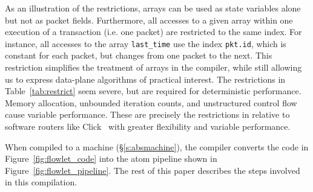 As an illustration of the restrictions, arrays can be used as state variables
alone but not as packet fields.  Furthermore, all accesses to a given array
within one execution of a transaction (i.e. one packet) are restricted to the
same index. For instance, all accesses to the array \texttt{last\_time} use the
index \texttt{pkt.id}, which is constant for each packet, but changes from one
packet to the next. This restriction simplifies the treatment of arrays in the
compiler, while still allowing us to express data-plane algorithms of practical
interest. The restrictions in Table~\ref{tab:restrict} seem severe, but are
required for deterministic performance.  Memory allocation, unbounded iteration
counts, and unstructured control flow cause variable performance. These are
precisely the restrictions in \pktlanguage relative to software routers like
Click~\cite{click} with greater flexibility and variable performance.

When compiled to a \absmachine machine (\S\ref{s:absmachine}), the \pktlanguage
compiler converts the code in Figure~\ref{fig:flowlet_code} into the atom
pipeline shown in Figure~\ref{fig:flowlet_pipeline}. The rest of this paper
describes the steps involved in this compilation.

%
